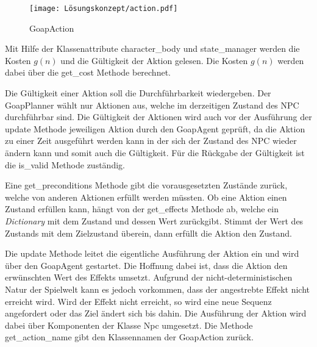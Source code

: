 \begin{figure}[h]
  \centering
  \texttt{[image: Lösungskonzept/action.pdf]}
	\captionsetup{justification=justified, format=plain}
  \caption{GoapAction}
  \label{fig:GoapAction}
\end{figure}

Mit Hilfe der Klassenattribute character\_body und state\_manager werden die Kosten $g(n)$ und die Gültigkeit der Aktion gelesen. Die Kosten $g(n)$ werden dabei über die get\_cost Methode berechnet.

Die Gültigkeit einer Aktion soll die Durchführbarkeit wiedergeben. Der GoapPlanner wählt nur Aktionen aus, welche im derzeitigen Zustand des NPC durchführbar sind. Die Gültigkeit der Aktionen wird auch vor der Ausführung der update Methode jeweiligen Aktion durch den GoapAgent geprüft, da die Aktion zu einer Zeit ausgeführt werden kann in der sich der Zustand des NPC wieder ändern kann und somit auch die Gültigkeit. Für die Rückgabe der Gültigkeit ist die is\_valid Methode zuständig.

Eine get\_preconditions Methode gibt die vorausgesetzten Zustände zurück, welche von anderen Aktionen erfüllt werden müssten. Ob eine Aktion einen Zustand erfüllen kann, hängt von der get\_effects Methode ab, welche ein \textit{Dictionary} mit dem Zustand und dessen Wert zurückgibt. Stimmt der Wert des Zustands mit dem Zielzustand überein, dann erfüllt die Aktion den Zustand.

Die update Methode leitet die eigentliche Ausführung der Aktion ein und wird über den GoapAgent gestartet. Die Hoffnung dabei ist, dass die Aktion den erwünschten Wert des Effekts umsetzt. Aufgrund der nicht-deterministischen Natur der Spielwelt kann es jedoch vorkommen, dass der angestrebte Effekt nicht erreicht wird. Wird der Effekt nicht erreicht, so wird eine neue Sequenz angefordert oder das Ziel ändert sich bis dahin. Die Ausführung der Aktion wird dabei über Komponenten der Klasse Npc umgesetzt. Die Methode get\_action\_name gibt den Klassennamen der GoapAction zurück.

